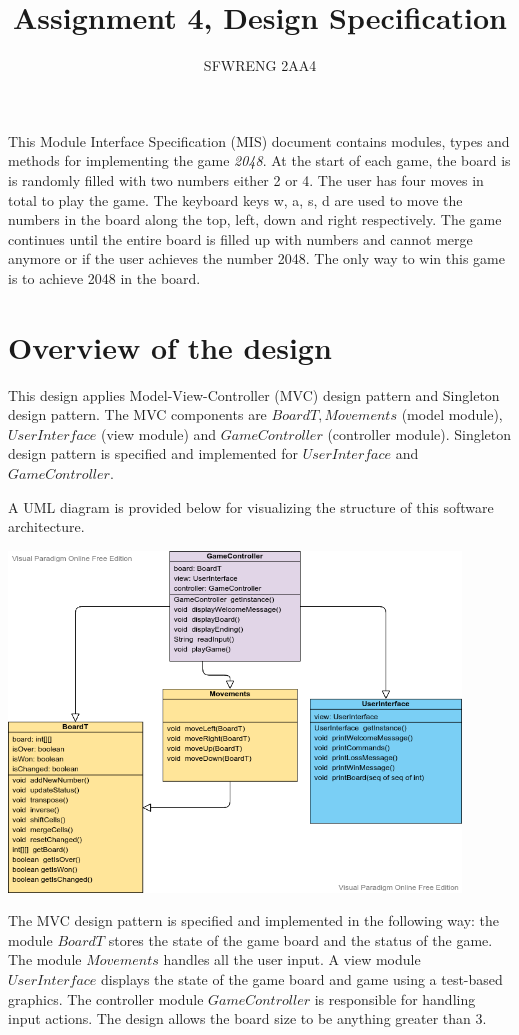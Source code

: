 \documentclass[12pt]{article}
\title{Assignment 4, Design Specification}
\author{SFWRENG 2AA4}
\begin{document}
\maketitle
This Module Interface Specification (MIS) document contains modules, types and
methods for implementing the game \textit{2048}. At the start of each game, the board is is randomly filled with two numbers either 2 or 4. The user has four moves in total to play the game. The keyboard keys w, a, s, d are used to move the numbers in the board along the top, left, down and right respectively. The game continues until the entire board is filled up with numbers and cannot merge anymore or if the user achieves the number 2048. The only way to win this game is to achieve 2048 in the board.

\section{Overview of the design}
This design applies Model-View-Controller (MVC) design pattern and Singleton design pattern. The MVC components are $BoardT, Movements$ (model module), $UserInterface$ (view module) and $GameController$ (controller module). Singleton design pattern is specified and implemented for $UserInterface$ and $GameController$.

\bigskip

\noindent A UML diagram is provided below for visualizing the structure of this software architecture.

\includegraphics[width=0.9\textwidth]{MVC-UML.png}
\\
\medskip

The MVC design pattern is specified and implemented in the following way: the module $BoardT$ stores the state of the game board and the status of the game. The module $Movements$ handles all the user input. A view module $UserInterface$ displays the state of the game board and game using a test-based graphics. The controller module $GameController$ is responsible for handling input actions. The design allows the board size to be anything greater than 3.
\medskip
\end{document}

